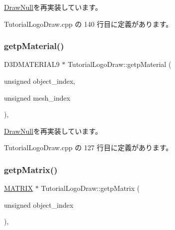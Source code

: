 \mbox{\hyperlink{class_draw_null_a2dfa2d2cbb66249f933420a38e9cadad}{Draw\+Null}}を再実装しています。



 Tutorial\+Logo\+Draw.\+cpp の 140 行目に定義があります。

\mbox{\label{class_tutorial_logo_draw_acbd9aefdbd4450188e561fb5e5dcd64f}} 
\subsubsection{\texorpdfstring{getp\+Material()}{getpMaterial()}}
{\footnotesize\ttfamily D3\+D\+M\+A\+T\+E\+R\+I\+A\+L9 $\ast$ Tutorial\+Logo\+Draw\+::getp\+Material (\begin{DoxyParamCaption}\item[{unsigned}]{object\+\_\+index,  }\item[{unsigned}]{mesh\+\_\+index }\end{DoxyParamCaption})\hspace{0.3cm}{\ttfamily [override]}, {\ttfamily [virtual]}}



\mbox{\hyperlink{class_draw_null_aa07d7e89e723b68ec257da0f63d43f70}{Draw\+Null}}を再実装しています。



 Tutorial\+Logo\+Draw.\+cpp の 127 行目に定義があります。

\mbox{\label{class_tutorial_logo_draw_aade531190180c385c266f5698f99735d}} 
\subsubsection{\texorpdfstring{getp\+Matrix()}{getpMatrix()}}
{\footnotesize\ttfamily \mbox{\hyperlink{_vector3_d_8h_a032295cd9fb1b711757c90667278e744}{M\+A\+T\+R\+IX}} $\ast$ Tutorial\+Logo\+Draw\+::getp\+Matrix (\begin{DoxyParamCaption}\item[{unsigned}]{object\+\_\+index }\end{DoxyParamCaption})\hspace{0.3cm}{\ttfamily [override]}, {\ttfamily [virtual]}}



